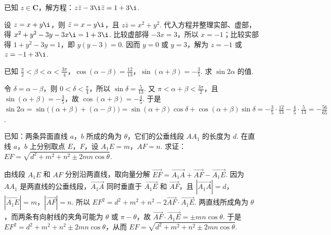 \begin{problem}
已知 \(z\in \mathbf{C}\)，解方程：\(z\bar{z}-3\i\bar{z}=1+3\i\).

\begin{solution}
设 \(z=x+y\i\)，则 \(\bar z=x-y\i\)，且 \(z\bar z=x^2+y^2\). 代入方程并整理实部、虚部，得
\(x^2+y^2-3y-3x\i=1+3\i\). 比较虚部得 \(-3x=3\)，所以 \(x=-1\)；比较实部得 \(1+y^2-3y=1\)，即 \(y(y-3)=0\). 因而 \(y=0\) 或 \(y=3\)，解为 \(z=-1\) 或 \(z=-1+3\i\).
\end{solution}
\end{problem}

\begin{problem}
已知 \(\frac{\pi}{2}<\beta<\alpha<\frac{3\pi}{4}\)，\(\cos(\alpha-\beta)=\frac{12}{13}\)，\(\sin(\alpha+\beta)=-\frac{3}{5}\). 求 \(\sin 2\alpha\) 的值.

\begin{solution}
令 \(\delta=\alpha-\beta\)，则 \(0<\delta<\frac{\pi}{4}\)，所以 \(\sin\delta=\frac{5}{13}\). 又 \(\pi<\alpha+\beta<\frac{3\pi}{2}\)，且 \(\sin(\alpha+\beta)=-\frac{3}{5}\)，故 \(\cos(\alpha+\beta)=-\frac{4}{5}\). 于是
\(\sin2\alpha=\sin\bigl((\alpha+\beta)+(\alpha-\beta)\bigr)=\sin(\alpha+\beta)\cos\delta+\cos(\alpha+\beta)\sin\delta= -\frac{3}{5}\cdot\frac{12}{13}-\frac{4}{5}\cdot\frac{5}{13}=-\frac{56}{65}\).
\end{solution}
\end{problem}

\begin{problem}
已知：两条异面直线 \(a\)，\(b\) 所成的角为 \(\theta\)，它们的公垂线段 \(AA_1\) 的长度为 \(d\). 在直线 \(a\)，\(b\) 上分别取点 \(E\)，\(F\)，设 \(A_1E=m\)，\(AF=n\). 求证：\(EF=\sqrt{d^2+m^2+n^2\pm 2mn\cos\theta}\).

\begin{solution}
由线段 \(A_1E\) 和 \(AF\) 分别沿两直线，取向量分解
\(\overrightarrow{EF}=\overrightarrow{A_1A}+\overrightarrow{AF}-\overrightarrow{A_1E}\). 因为 \(AA_1\) 是两直线的公垂线段，\(\overrightarrow{A_1A}\) 同时垂直于 \(\overrightarrow{A_1E}\) 和 \(\overrightarrow{AF}\)，且 \(|\overrightarrow{A_1A}|=d\)，\(|\overrightarrow{A_1E}|=m\)，\(|\overrightarrow{AF}|=n\). 所以
\(EF^2=d^2+m^2+n^2-2\overrightarrow{AF}\cdot\overrightarrow{A_1E}\). 两直线所成角为 \(\theta\)，而两条有向射线的夹角可能为 \(\theta\) 或 \(\pi-\theta\)，故 \(\overrightarrow{AF}\cdot\overrightarrow{A_1E}=\pm mn\cos\theta\). 于是 \(EF^2=d^2+m^2+n^2\pm2mn\cos\theta\)，从而 \(EF=\sqrt{d^2+m^2+n^2\pm2mn\cos\theta}\).
\end{solution}
\end{problem}

